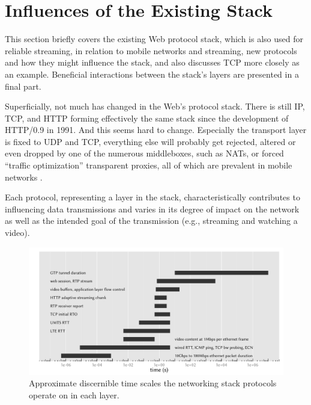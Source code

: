 \section{Influences of the Existing Stack}
\label{c5:sec:stack-influences}

This section briefly covers the existing Web protocol stack, which is also used for reliable streaming, in relation to mobile networks and streaming, new protocols and how they might influence the stack, and also discusses \gls{TCP} more closely as an example. Beneficial interactions between the stack's layers are presented in a final part.

Superficially, not much has changed in the Web's protocol stack. There is still \gls{IP}, \gls{TCP}, and \gls{HTTP} forming effectively the same stack since the development of HTTP/0.9 in 1991. And this seems hard to change. Especially the transport layer is fixed to \gls{UDP} and \gls{TCP}, everything else will probably get rejected, altered or even dropped by one of the numerous middleboxes, such as \glspl{NAT}, or forced ``traffic optimization'' transparent proxies, all of which are prevalent in mobile networks \cite{sigcomm11middleboxes}.

Each protocol, representing a layer in the stack, characteristically contributes to influencing data transmissions and varies in its degree of impact on the network as well as the intended goal of the transmission (e.g., streaming and watching a video).

\begin{figure}[htb]
	\centering
	\includegraphics[width=1.0\textwidth]{images/layer-timescales.pdf}
	\caption{Approximate discernible time scales the networking stack protocols operate on in each layer.}
\label{c5:fig:timescales}
\end{figure}


